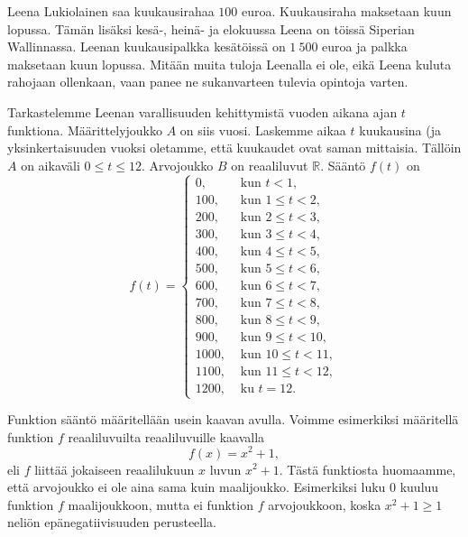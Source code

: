 \begin{esimerkki}
Leena Lukiolainen saa kuukausirahaa $100$ euroa.  Kuukausiraha maksetaan kuun lopussa. Tämän lisäksi kesä-, heinä- ja elokuussa Leena on töissä Siperian Wallinnassa.  Leenan kuukausipalkka kesätöissä on $1\ 500$ euroa ja palkka maksetaan kuun lopussa.  Mitään muita tuloja Leenalla ei ole, eikä Leena kuluta rahojaan ollenkaan, vaan panee ne sukanvarteen tulevia opintoja varten. 

Tarkastelemme Leenan varallisuuden kehittymistä vuoden aikana ajan $t$ funktiona. Määrittelyjoukko $A$ on siis vuosi. Laskemme aikaa $t$ kuukausina (ja yksinkertaisuuden vuoksi oletamme, että kuukaudet ovat saman mittaisia. Tällöin $A$ on aikaväli $0\le t\le 12$. Arvojoukko $B$ on reaaliluvut $\mathbb{R}$.  Sääntö $f(t)$ on
$$
f(t) = \left\{\begin{array}{rl}
0, & \text{ kun } t<1, \\
100, & \text{ kun } 1\le t < 2, \\
200, & \text{ kun } 2\le t < 3, \\
300, & \text{ kun } 3\le t < 4, \\
400, & \text{ kun } 4\le t < 5, \\
500, & \text{ kun } 5\le t < 6, \\
600, & \text{ kun } 6\le t < 7, \\
700, & \text{ kun } 7\le t < 8, \\
800, & \text{ kun } 8\le t < 9, \\
900, & \text{ kun } 9\le t < 10, \\
1000, & \text{ kun } 10\le t < 11, \\
1100, & \text{ kun } 11\le t < 12, \\
1200, & \text{ ku } t=12.
\end{array}\right.
$$
\end{esimerkki}



Funktion sääntö määritellään usein kaavan avulla. Voimme esimerkiksi määritellä funktion $f$ reaaliluvuilta reaaliluvuille kaavalla
\[f(x) = x^2 + 1,\]
eli $f$ liittää jokaiseen reaalilukuun $x$ luvun $x^2+1$. Tästä funktiosta huomaamme, että arvojoukko ei ole aina sama kuin maalijoukko. Esimerkiksi luku $0$ kuuluu funktion $f$ maalijoukkoon, mutta ei funktion $f$ arvojoukkoon, koska $x^2+1\geq 1$ neliön epänegatiivisuuden perusteella.


